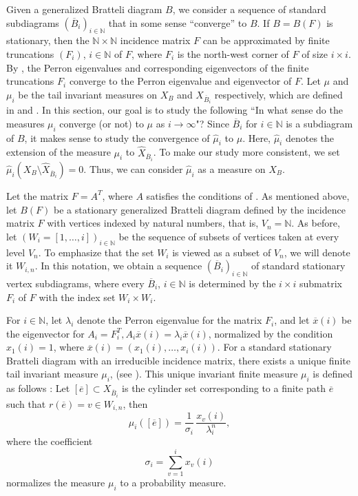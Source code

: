 \documentclass[11pt,reqno]{amsart}
\theoremstyle{definition}
\theoremstyle{remark}
\theoremstyle{plain}
\def\ol{\overline}
\def\wh{\widehat}
\newcommand{\N}{\mathbb N}
\numberwithin{equation}{section}
\begin{document}
Given a generalized Bratteli diagram $B$, we consider a sequence of standard subdiagrams $(\overline B_i)_{i \in \N}$ that in some sense ``converge'' to $B$. If $B = B(F)$ is stationary, then the $\N \times \N$ incidence matrix $F$ can be approximated by finite truncations $(F_i)$, $i \in \N$ of $F$, where $F_i$ is the north-west corner of $F$ of size $i \times i$. By , the Perron eigenvalues and corresponding eigenvectors of the finite truncations $F_i$ converge to the Perron eigenvalue and eigenvector of $F$. Let $\mu$ and $\mu_i$ be the tail invariant measures on $X_B$ and $X_{\ol B_i}$ respectively, which are defined in  and . In this section, our goal is to study the following ``In what sense do the measures $\mu_i$ converge (or not) to $\mu$ as $i \rightarrow \infty$"? Since $\ol B_i$ for $i \in \N$ is a subdiagram of $B$, it makes sense to study the convergence of $\wh \mu_i$ to $\mu$. Here, $\wh \mu_i$ denotes the extension of the measure $\mu_i$ to $\wh X_{\overline B_i}$. To make our study more consistent, we set $\wh \mu_i (X_B \setminus \wh X_{\overline B_i} ) = 0$. Thus, we can consider $\wh \mu_i$ as a measure on $X_{B}$.

Let the matrix $F = A^T$, where $A$ satisfies the conditions of . As mentioned above, let $B(F)$ be a stationary generalized Bratteli diagram defined by the incidence matrix $F$ with vertices indexed by natural numbers, that is, 
$V_n = \N$. As before, let $(W_i = [1, \ldots, i])_{i \in \N}$ be the sequence of subsets of vertices taken at every level
$V_n$. To emphasize that the set $W_i$ is viewed as a subset of $V_n$, we will denote it $W_{i, n}$. In this notation, we obtain a sequence $(\ol B_i)_{i \in \N}$ of standard stationary vertex subdiagrams,
where every $\ol B_i$, $i \in \N$ 
is determined by the $ i\times i$ submatrix $F_i$ of $F$ with the index set $W_i \times W_i$. 

For $i \in \N$, let $\lambda_i$ denote the Perron eigenvalue for the matrix $F_i$, and
let $\ol x(i)$ be the eigenvector for $A_i = F_i^T, A_i \ol x(i) = \lambda_i \ol x(i)$, normalized by the condition $x_1(i) =1$, where $\ol x(i) = (x_1(i),\ldots, x_i(i)) $. For a standard stationary Bratteli diagram with an irreducible incidence matrix, there exists a unique finite tail invariant measure $\mu_i$,
(see ). This unique invariant finite measure $\mu_i$ is defined as follows : Let $[\overline e] \subset X_{\ol B_i}$ is the cylinder set corresponding to a finite path $\overline e$ such that $r(\overline e) = v \in W_{i,n}$, then 
\begin{equation}\label{mui}
    \mu_i ([\overline e]) = \dfrac{1}{\sigma_i} \,\dfrac{x_v (i)}{\lambda_i^n},
\end{equation} 
where the coefficient
$$
\sigma_i = \sum_{v=1}^i x_v(i)
$$
normalizes the measure $\mu_i$ to a probability measure.
\end{document}
